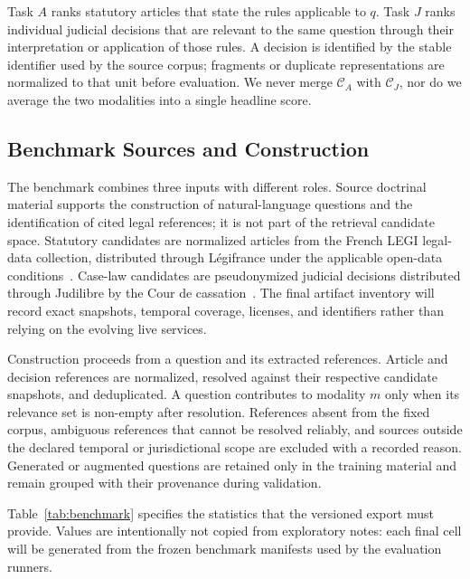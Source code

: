 \documentclass[runningheads]{llncs}
\begin{document}
Task \(A\) ranks statutory articles that state the rules applicable to \(q\). Task \(J\) ranks individual judicial decisions that are relevant to the same question through their interpretation or application of those rules. A decision is identified by the stable identifier used by the source corpus; fragments or duplicate representations are normalized to that unit before evaluation. We never merge \(\mathcal{C}_A\) with \(\mathcal{C}_J\), nor do we average the two modalities into a single headline score.

\subsection{Benchmark Sources and Construction}

The benchmark combines three inputs with different roles. Source doctrinal material supports the construction of natural-language questions and the identification of cited legal references; it is not part of the retrieval candidate space. Statutory candidates are normalized articles from the French LEGI legal-data collection, distributed through L\'egifrance under the applicable open-data conditions~\cite{legifrance2023opendata}. Case-law candidates are pseudonymized judicial decisions distributed through Judilibre by the Cour de cassation~\cite{courdecassation2026judilibre}. The final artifact inventory will record exact snapshots, temporal coverage, licenses, and identifiers rather than relying on the evolving live services.

Construction proceeds from a question and its extracted references. Article and decision references are normalized, resolved against their respective candidate snapshots, and deduplicated. A question contributes to modality \(m\) only when its relevance set is non-empty after resolution. References absent from the fixed corpus, ambiguous references that cannot be resolved reliably, and sources outside the declared temporal or jurisdictional scope are excluded with a recorded reason. Generated or augmented questions are retained only in the training material and remain grouped with their provenance during validation.

Table~\ref{tab:benchmark} specifies the statistics that the versioned export must provide. Values are intentionally not copied from exploratory notes: each final cell will be generated from the frozen benchmark manifests used by the evaluation runners.
\end{document}
